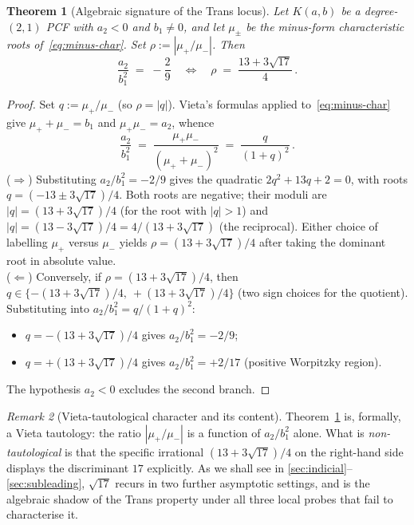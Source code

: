 \documentclass[11pt]{amsart}
\newtheorem{theorem}{Theorem}[section]
\theoremstyle{definition}
\theoremstyle{remark}
\newtheorem{remark}[theorem]{Remark}
\begin{document}
\begin{theorem}[Algebraic signature of the Trans locus]
\label{thm:signature}
Let $K(a,b)$ be a degree-$(2,1)$ PCF with $a_2 < 0$ and $b_1 \ne 0$,
and let $\mu_\pm$ be the minus-form characteristic roots
of~\eqref{eq:minus-char}.  Set $\rho := |\mu_+/\mu_-|$.  Then
\begin{equation}\label{eq:signature}
  \frac{a_2}{b_1^2} \;=\; -\frac{2}{9}
  \quad\Longleftrightarrow\quad
  \rho \;=\; \frac{13 + 3\sqrt{17}}{4}\,.
\end{equation}
\end{theorem}
\begin{proof}
Set $q := \mu_+/\mu_-$ (so $\rho = |q|$).  Vieta's formulas applied
to~\eqref{eq:minus-char} give $\mu_+ + \mu_- = b_1$ and
$\mu_+\mu_- = a_2$, whence
\[
\frac{a_2}{b_1^2}
\;=\; \frac{\mu_+\mu_-}{(\mu_+ + \mu_-)^2}
\;=\; \frac{q}{(1+q)^2}\,.
\]
($\Rightarrow$) Substituting $a_2/b_1^2 = -2/9$ gives the quadratic
$2q^2 + 13 q + 2 = 0$, with roots
\(q = (-13 \pm 3\sqrt{17})/4\).
Both roots are negative; their moduli are
\(|q| = (13 + 3\sqrt{17})/4\) (for the root with $|q|>1$) and
\(|q| = (13 - 3\sqrt{17})/4 = 4/(13+3\sqrt{17})\) (the reciprocal).
Either choice of labelling $\mu_+$ versus $\mu_-$ yields
$\rho = (13+3\sqrt{17})/4$ after taking the dominant root in absolute
value.
\\
($\Leftarrow$) Conversely, if $\rho = (13+3\sqrt{17})/4$, then
$q \in \{-(13+3\sqrt{17})/4,\ +(13+3\sqrt{17})/4\}$ (two
sign choices for the quotient).  Substituting into
$a_2/b_1^2 = q/(1+q)^2$:
\begin{itemize}[leftmargin=1.4em]
\item $q = -(13+3\sqrt{17})/4$ gives $a_2/b_1^2 = -2/9$;
\item $q = +(13+3\sqrt{17})/4$ gives $a_2/b_1^2 = +2/17$
(positive Worpitzky region).
\end{itemize}
The hypothesis $a_2 < 0$ excludes the second branch.
\end{proof}

\begin{remark}[Vieta-tautological character and its content]
\label{rem:vieta-tautology}
Theorem~\ref{thm:signature} is, formally, a Vieta tautology: the
ratio $|\mu_+/\mu_-|$ is a function of $a_2/b_1^2$ alone.  What is
\emph{non-tautological} is that the specific irrational
$(13+3\sqrt{17})/4$ on the right-hand side displays the discriminant
$17$ explicitly.  As we shall see in
\textsection\textsection\ref{sec:indicial}--\ref{sec:subleading},
$\sqrt{17}$ recurs in two further asymptotic settings, and is the
algebraic shadow of the Trans property under all three local probes
that fail to characterise it.
\end{remark}
\end{document}
